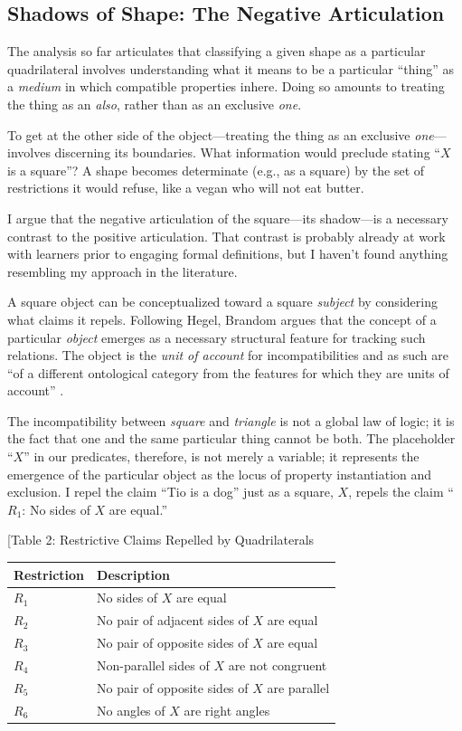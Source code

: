 \documentclass[12pt]{book}
\begin{document}
\subsection*{Shadows of Shape: The Negative Articulation}\label{shadows-of-shape-the-negative-articulation}

The analysis so far articulates that classifying a given shape as a particular quadrilateral involves understanding what it means to be a particular ``thing'' as a \emph{medium} in which compatible properties inhere. Doing so amounts to treating the thing as an \emph{also}, rather than as an exclusive \emph{one}.

To get at the other side of the object---treating the thing as an exclusive \emph{one}---involves discerning its boundaries. What information would preclude stating ``\(X\) is a square''? A shape becomes determinate (e.g., as a square) by the set of restrictions it would refuse, like a vegan who will not eat butter.

I argue that the negative articulation of the square---its shadow---is a necessary contrast to the positive articulation. That contrast is probably already at work with learners prior to engaging formal definitions, but I haven't found anything resembling my approach in the literature.

A square object can be conceptualized toward a square \emph{subject} by considering what claims it repels. Following Hegel, Brandom argues that the concept of a particular \emph{object} emerges as a necessary structural feature for tracking such relations. The object is the \emph{unit of account} for incompatibilities and as such are ``of a different ontological category from the features for which they are units of account'' \parencite[150]{Brandom:2019aa}.

The incompatibility between \emph{square} and \emph{triangle} is not a global law of logic; it is the fact that one and the same particular thing cannot be both. The placeholder ``\(X\)'' in our predicates, therefore, is not merely a variable; it represents the emergence of the particular object as the locus of property instantiation and exclusion. I repel the claim ``Tio is a dog'' just as a square, \(X\), repels the claim ``\(R_1\): No sides of \(X\) are equal.''

{[}Table 2: Restrictive Claims Repelled by Quadrilaterals

\begin{longtable}[]{@{}ll@{}}
\toprule\noalign{}
Restriction & Description \\
\midrule\noalign{}
\endhead
\bottomrule\noalign{}
\endlastfoot
\(R_1\) & No sides of \(X\) are equal \\
\(R_2\) & No pair of adjacent sides of \(X\) are equal \\
\(R_3\) & No pair of opposite sides of \(X\) are equal \\
\(R_4\) & Non-parallel sides of \(X\) are not congruent \\
\(R_5\) & No pair of opposite sides of \(X\) are parallel \\
\(R_6\) & No angles of \(X\) are right angles \\
\end{longtable}
\end{document}
